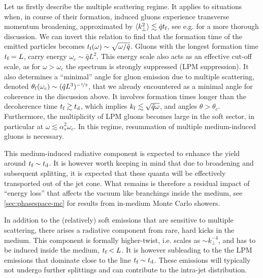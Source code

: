 Let us firstly describe the multiple scattering regime. It applies to situations when, in course of their formation, induced gluons experience transverse momentum broadening, approximated by $\langle k_\perp^2 \rangle \lesssim \hat q t_\text{f}$, see e.g. \cite{Kurkela:2014tla} for a more thorough discussion. We can invert this relation to find that the formation time of the emitted particles becomes $t_\text{f}(\omega) \sim \sqrt{\omega/\hat q}$. 
Gluons with the longest formation time $t_\text{f}= L$, carry energy $\omega_c \sim \hat q L^2$.
This energy scale also acts as an effective cut-off scale, as for $\omega > \omega_c$ the spectrum is strongly suppressed (LPM suppression). It also determines a ``minimal'' angle for gluon emission due to multiple scattering, denoted $\theta_{\rm f}(\omega_c) \sim (\hat q L^3)^{-{\nicefrac{1}{2}}}$, that we already encountered as a minimal angle for coherence in the discussion above.
It involves formation times longer than the decoherence time $t_\text{f} \gtrsim t_\text{d}$, which implies $k_{\rm f} \lesssim \sqrt{\hat q \omega}$, and angles $\theta > \theta_c$. Furthermore, the multiplicity of LPM gluons becomes large in the soft sector, in particular at $\omega \lesssim \alpha_s^2 \omega_c$. In this regime, resummation of multiple medium-induced gluons is necessary.

This medium-induced radiative component is expected to enhance the yield around $t_\text{f} \sim t_\text{d}$. It is however worth keeping in mind that due to broadening and subsequent splitting, it is expected that these quanta will be effectively transported out of the jet cone. What remains is therefore a residual impact of ``energy loss'' that affects the vacuum like branchings inside the medium, see \autoref{sec:phasespace-mc} for results from in-medium Monte Carlo showers.

In addition to the (relatively) soft emissions that are sensitive to multiple scattering, there arises a radiative component from rare, hard kicks in the medium. This component is formally higher-twist, i.e. scales as $\sim k_\perp^{-4}$, and has to be induced inside the medium, $t_\text{f} < L$. It is however subleading to the the LPM emissions that dominate close to the line $t_\text{f} \sim t_\text{d}$.
These emissions will typically not undergo further splittings and can contribute to the intra-jet distribution. 

